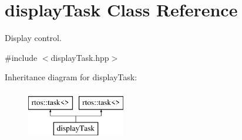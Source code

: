 \hypertarget{classdisplay_task}{}\section{display\+Task Class Reference}
\label{classdisplay_task}


Display control.  




{\ttfamily \#include $<$display\+Task.\+hpp$>$}

Inheritance diagram for display\+Task\+:\begin{figure}[H]
\begin{center}
\leavevmode
\includegraphics[height=2.000000cm]{classdisplay_task}
\end{center}
\end{figure}
